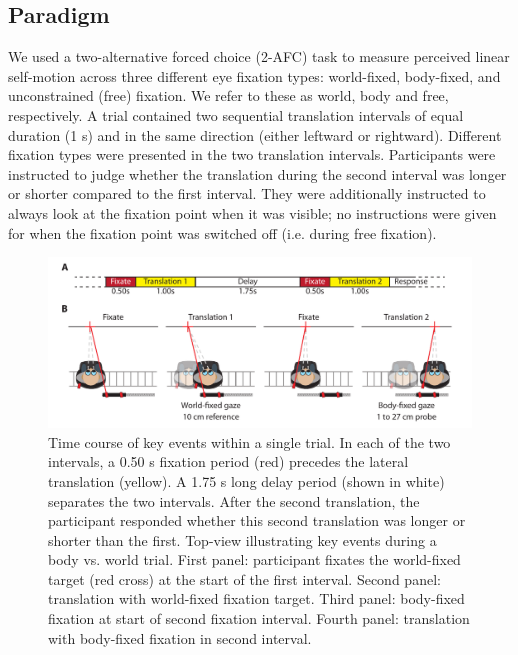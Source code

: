 \subsection{Paradigm}
We used a two-alternative forced choice (2-AFC) task to measure perceived linear self-motion across three different eye fixation types: world-fixed, body-fixed, and unconstrained (free) fixation. We refer to these as world, body and free, respectively. A trial contained two sequential translation intervals of equal duration (1 \si{\second}) and in the same direction (either leftward or rightward). Different fixation types were presented in the two translation intervals. Participants were instructed to judge whether the translation during the second interval was longer or shorter compared to the first interval. They were additionally instructed to always look at the fixation point when it was visible; no instructions were given for when the fixation point was switched off (i.e. during free fixation).


\begin{figure}
    \includegraphics[width=1.0\textwidth]{src/paper3/figure1.pdf}

    \caption{ Time course of key events within a single trial. In each of the two intervals, a 0.50 \si{\second} fixation period (red) precedes the lateral translation (yellow). A 1.75 \si{\second} long delay period (shown in white) separates the two intervals. After the second translation, the participant responded whether this second translation was longer or shorter than the first.  Top-view illustrating key events during a body vs. world trial. First panel: participant fixates the world-fixed target (red cross) at the start of the first interval. Second panel: translation with world-fixed fixation target. Third panel: body-fixed fixation at start of second fixation interval. Fourth panel: translation with body-fixed fixation in second interval.}
    \label{p3:fig1}
\end{figure}

